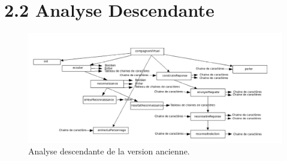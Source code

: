 \documentclass[pdftex, a4paper,12pt]{report}
\begin{document}
\section*{2.2 Analyse Descendante}
\begin{figure}[h]
\centering
\includegraphics[width=1\linewidth]{analyseDescendante.png}
\caption{Analyse descendante de la version ancienne.\label{fig1}}
\end{figure}
\end{document}
